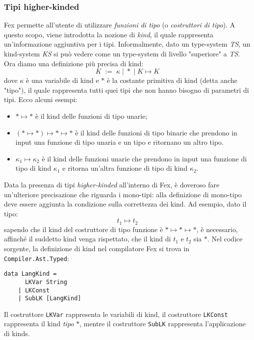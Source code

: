 \documentclass[10pt,a4paper]{article}
\begin{document}
\subsubsection{Tipi higher-kinded}
Fex permette all'utente di utilizzare \textit{funzioni di tipo} (o \textit{costruttori di tipo}). A questo scopo,
viene introdotta la nozione di \textit{kind}, il quale rappresenta un'informazione aggiuntiva per i tipi. Informalmente,
dato un type-system \textit{TS}, un kind-system \textit{KS} si può vedere come un type-system di livello "superiore"
a \textit{TS}. Ora diamo una definizione più precisa di kind:
\[ K \; := \; \kappa \; | \; * \; | \; K \mapsto K \]
dove $ \kappa $ è una variabile di kind e $ * $ è la costante primitiva di kind (detta anche "tipo"), il quale
rappresenta tutti quei tipi che non hanno bisogno di parametri di tipi. Ecco alcuni esempi:
\begin{itemize}
    \item $ * \mapsto * $ è il kind delle funzioni di tipo unarie;
    \item $ (* \mapsto *) \mapsto * \mapsto * $ è il kind delle funzioni di tipo binarie che prendono in input una
    funzione di tipo unaria e un tipo e ritornano un altro tipo.
    \item $ \kappa_1 \mapsto \kappa_2 $ è il kind delle funzioni unarie che prendono in input una funzione di tipo
    di kind $ \kappa_1 $ e ritorna un'altra funzione di tipo di kind $ \kappa_2 $.
\end{itemize}
Data la presenza di tipi \textit{higher-kinded} all'interno di Fex, è doveroso fare un'ulteriore precisazione che
riguarda i mono-tipi: alla definizione di mono-tipo deve essere aggiunta la condizione sulla correttezza dei kind.
Ad esempio, dato il tipo:
\[ t_1 \mapsto t_2 \]
sapendo che il kind del costruttore di tipo funzione è $ * \mapsto * \mapsto * $, è necessario, affinché il suddetto
kind venga rispettato, che il kind di $ t_1 $ e $ t_2 $ sia $ * $.
Nel codice sorgente, la definizione di kind nel compilatore Fex si trova in \texttt{Compiler.Ast.Typed}:
\begin{lstlisting}
data LangKind =
      LKVar String
    | LKConst
    | SubLK [LangKind]
\end{lstlisting}
Il costruttore \texttt{LKVar} rappresenta le variabili di kind, il costruttore \texttt{LKConst} rappresenta il kind
\textit{tipo} $ * $, mentre il costruttore \texttt{SubLK} rappresenta l'applicazione di kinds.
\end{document}
